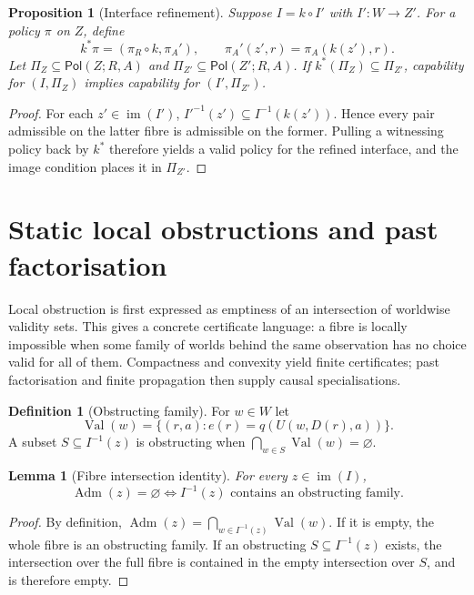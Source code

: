 \documentclass[11pt]{article}
\theoremstyle{plain}
\newtheorem{proposition}[theorem]{Proposition}
\newtheorem{lemma}[theorem]{Lemma}
\theoremstyle{definition}
\newtheorem{definition}[theorem]{Definition}
\theoremstyle{remark}
\newcommand{\im}{\operatorname{im}}
\newcommand{\Adm}{\operatorname{Adm}}
\newcommand{\Pol}{\mathsf{Pol}}
\begin{document}
\begin{proposition}[Interface refinement]\label{prop:refine}
Suppose $I=k\circ I'$ with $I':W\to Z'$. For a policy $\pi$ on $Z$, define
\[
k^*\pi=(\pi_R\circ k,\pi_A'),\qquad
\pi_A'(z',r)=\pi_A(k(z'),r).
\]
Let $\Pi_Z\subseteq\Pol(Z;R,A)$ and
$\Pi_{Z'}\subseteq\Pol(Z';R,A)$. If
$k^*(\Pi_Z)\subseteq\Pi_{Z'}$, capability for $(I,\Pi_Z)$ implies capability
for $(I',\Pi_{Z'})$.
\end{proposition}

\begin{proof}
For each $z'\in\im(I')$,
$I'^{-1}(z')\subseteq I^{-1}(k(z'))$. Hence every pair admissible on the latter
fibre is admissible on the former. Pulling a witnessing policy back by $k^*$
therefore yields a valid policy for the refined interface, and the image
condition places it in $\Pi_{Z'}$.
\end{proof}

\section{Static local obstructions and past factorisation}\label{sec:static-local}

Local obstruction is first expressed as emptiness of an intersection of
worldwise validity sets. This gives a concrete certificate language: a fibre is
locally impossible when some family of worlds behind the same observation has no
choice valid for all of them. Compactness and convexity yield finite
certificates; past factorisation and finite propagation then supply causal
specialisations.



\begin{definition}[Obstructing family]\label{def:obfamily}
For $w\in W$ let
\[
\operatorname{Val}(w)=\{(r,a):e(r)=q(U(w,D(r),a))\}.
\]
A subset $S\subseteq I^{-1}(z)$ is obstructing when
$\bigcap_{w\in S}\operatorname{Val}(w)=\varnothing$.
\end{definition}

\begin{lemma}[Fibre intersection identity]\label{lem:Wfam}
For every $z\in\im(I)$,
\[
\Adm(z)=\varnothing
\iff
I^{-1}(z)\text{ contains an obstructing family}.
\]
\end{lemma}

\begin{proof}
By definition,
$\Adm(z)=\bigcap_{w\in I^{-1}(z)}\operatorname{Val}(w)$. If it is empty, the
whole fibre is an obstructing family. If an obstructing
$S\subseteq I^{-1}(z)$ exists, the intersection over the full fibre is contained
in the empty intersection over $S$, and is therefore empty.
\end{proof}
\end{document}
